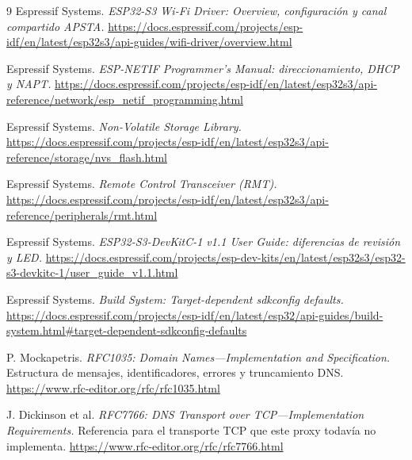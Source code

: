 \documentclass[11pt,a4paper]{article}
\begin{document}
\begin{thebibliography}{9}
 Espressif Systems.
\emph{ESP32-S3 Wi-Fi Driver: Overview, configuración y canal compartido APSTA.}
\url{https://docs.espressif.com/projects/esp-idf/en/latest/esp32s3/api-guides/wifi-driver/overview.html}

 Espressif Systems.
\emph{ESP-NETIF Programmer's Manual: direccionamiento, DHCP y NAPT.}
\url{https://docs.espressif.com/projects/esp-idf/en/latest/esp32s3/api-reference/network/esp_netif_programming.html}

 Espressif Systems.
\emph{Non-Volatile Storage Library.}
\url{https://docs.espressif.com/projects/esp-idf/en/latest/esp32s3/api-reference/storage/nvs_flash.html}

 Espressif Systems.
\emph{Remote Control Transceiver (RMT).}
\url{https://docs.espressif.com/projects/esp-idf/en/latest/esp32s3/api-reference/peripherals/rmt.html}

 Espressif Systems.
\emph{ESP32-S3-DevKitC-1 v1.1 User Guide: diferencias de revisión y LED.}
\url{https://docs.espressif.com/projects/esp-dev-kits/en/latest/esp32s3/esp32-s3-devkitc-1/user_guide_v1.1.html}

 Espressif Systems.
\emph{Build System: Target-dependent sdkconfig defaults.}
\url{https://docs.espressif.com/projects/esp-idf/en/latest/esp32/api-guides/build-system.html#target-dependent-sdkconfig-defaults}

 P. Mockapetris.
\emph{RFC1035: Domain Names---Implementation and Specification.}
Estructura de mensajes, identificadores, errores y truncamiento DNS.
\url{https://www.rfc-editor.org/rfc/rfc1035.html}

 J. Dickinson et al.
\emph{RFC7766: DNS Transport over TCP---Implementation Requirements.}
Referencia para el transporte TCP que este proxy todavía no implementa.
\url{https://www.rfc-editor.org/rfc/rfc7766.html}
\end{thebibliography}
\end{document}
